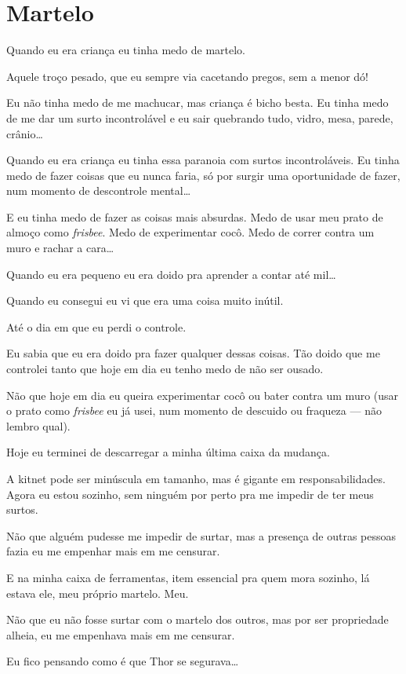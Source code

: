 \chapter{Martelo}

Quando eu era criança eu tinha medo de martelo.

Aquele troço pesado, que eu sempre via cacetando pregos, sem a menor dó!

Eu não tinha medo de me machucar, mas criança é bicho besta. Eu tinha medo de me dar um surto incontrolável e eu sair quebrando tudo, vidro, mesa, parede, crânio\ldots

Quando eu era criança eu tinha essa paranoia com surtos incontroláveis. Eu tinha medo de fazer coisas que eu nunca faria, só por surgir uma oportunidade de fazer, num momento de descontrole mental\ldots

E eu tinha medo de fazer as coisas mais absurdas. Medo de usar meu prato de almoço como \emph{frisbee}. Medo de experimentar cocô. Medo de correr contra um muro e rachar a cara\ldots

Quando eu era pequeno eu era doido pra aprender a contar até mil\ldots

Quando eu consegui eu vi que era uma coisa muito inútil.

Até o dia em que eu perdi o controle.

Eu sabia que eu era doido pra fazer qualquer dessas coisas. Tão doido que me controlei tanto que hoje em dia eu tenho medo de não ser ousado.

Não que hoje em dia eu queira experimentar cocô ou bater contra um muro (usar o prato como \emph{frisbee} eu já usei, num momento de descuido ou fraqueza --- não lembro qual).

Hoje eu terminei de descarregar a minha última caixa da mudança.

A kitnet pode ser minúscula em tamanho, mas é gigante em responsabilidades. Agora eu estou sozinho, sem ninguém por perto pra me impedir de ter meus surtos.

Não que alguém pudesse me impedir de surtar, mas a presença de outras pessoas fazia eu me empenhar mais em me censurar.

E na minha caixa de ferramentas, item essencial pra quem mora sozinho, lá estava ele, meu próprio martelo. Meu.

Não que eu não fosse surtar com o martelo dos outros, mas por ser propriedade alheia, eu me empenhava mais em me censurar.

Eu fico pensando como é que Thor se segurava\ldots

